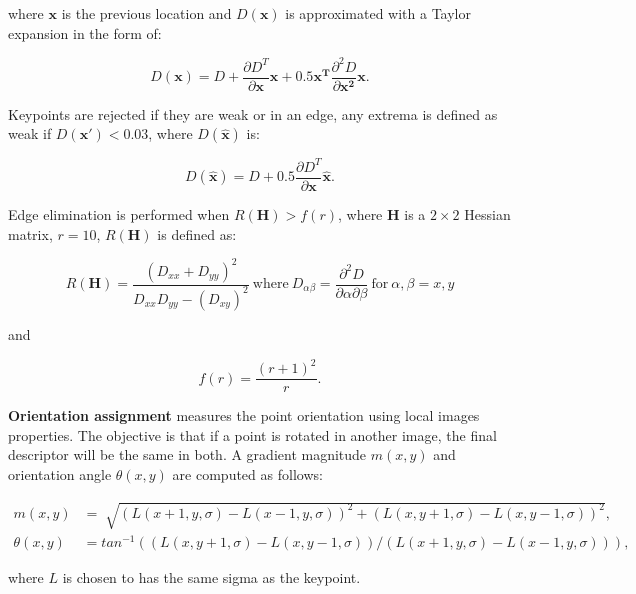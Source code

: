 \documentclass[12pt]{article}
\begin{document}
where $\mathbf{x}$ is the previous location and $D(\mathbf{x})$ is approximated with a Taylor expansion in the form of:

\begin{equation}
D(\mathbf{x}) = D + \frac{ \partial D^T}{\partial \mathbf{x}} \mathbf{x} + 0.5 \mathbf{x^T} \frac{\partial^2 D}{\partial \mathbf{x^2}}\mathbf{x}.
\end{equation}

Keypoints are rejected if they are weak or in an edge, any extrema is defined as weak if $D(\mathbf{x'}) < 0.03$, where $D(\mathbf{\hat{x}})$ is:

\begin{equation}
D(\mathbf{\hat{x}}) = D + 0.5 \frac{\partial D^T}{\partial \mathbf{x}}\mathbf{\hat{x}}.
\end{equation}

Edge elimination is performed when $R(\mathbf{H}) > f(r)$, where $\mathbf{H}$ is a $2 \times 2$ Hessian matrix, $r = 10$, $R(\mathbf{H})$ is defined as:

\begin{equation}
R(\mathbf{H})= \frac{ (D_{xx} + D_{yy})^2 }{ D_{xx} D_{yy} - (D_{xy})^2} ~ \text{where} ~ D_{\alpha \beta} = \frac{\partial^2 D}{\partial \alpha \partial \beta} ~  \text{for} ~ \alpha, \beta = x, y
\end{equation}

and 

\begin{equation}
f(r) = \frac{(r + 1)^2}{r}.
\end{equation}

\textbf{Orientation assignment} measures the point orientation using local images properties.
The objective is that if a point is rotated in another image, the final descriptor will be the same in both.
A gradient magnitude $m(x,y)$ and orientation angle $\theta(x,y)$ are computed as follows:

\begin{equation}
\begin{aligned}
	m(x,y) &= \sqrt[]{(L(x+1,y,\sigma) - L(x-1,y,\sigma))^2 + (L(x,y+1,\sigma) - L(x,y-1,\sigma))^2}, \\
	\theta(x,y) &= tan^{-1} \left( \left( L(x,y+1,\sigma) - L(x, y-1, \sigma) \right) / \left( L(x+1,y,\sigma) - L(x-1, y, \sigma) \right) \right),
\end{aligned} \label{eq:conv}
\end{equation}

where $L$ is chosen to has the same sigma as the keypoint.
\end{document}
